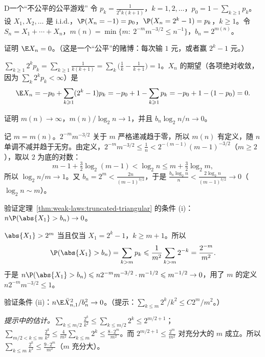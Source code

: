 \thinkingpart

\begin{probleme}[问题]{D}{一个“不公平的公平游戏”}
令 $p_k=\frac1{2^kk(k+1)}$，$k=1,2,\dots$，$p_0=1-\sum_{k\geqslant1}p_k$。设 $X_1,X_2,\dots$ 是 i.i.d.，$\P(X_n=-1)=p_0$，$\P(X_n=2^k-1)=p_k$，$k\geqslant1$。令 $S_n=X_1+\cdots+X_n$，$m(n)=\min\{m:\ 2^{-m}m^{-3/2}\leqslant n^{-1}\}$，$b_n=2^{m(n)}$。
\begin{questions}
\item 证明 $\E X_n=0$。（这是一个“公平”的赌博：每次输 $1$ 元，或者赢 $2^k-1$ 元。）
\begin{solution}
$\sum_{k\geqslant1}2^kp_k=\sum_{k\geqslant1}\frac1{k(k+1)}=\sum_k\bigl(\frac1k-\frac1{k+1}\bigr)=1$。$X_n$ 的期望（各项绝对收敛，因为 $\sum_k2^kp_k<\infty$）是
\[
\E X_n=-p_0+\sum_{k\geqslant1}(2^k-1)p_k=-p_0+1-\sum_{k\geqslant1}p_k=-p_0+1-(1-p_0)=0 .
\]
\end{solution}
\item 证明 $m(n)\to\infty$，$m(n)/\log_2n\to1$，并且 $b_n\log_2n/n\to0$。
\begin{solution}
记 $m=m(n)$。$2^{-m}m^{-3/2}$ 关于 $m$ 严格递减趋于零，所以 $m(n)$ 有定义，随 $n$ 单调不减并趋于无穷。由定义，$2^{-m}m^{-3/2}\leqslant\frac1n<2^{-(m-1)}(m-1)^{-3/2}$（$m\geqslant2$），取以 $2$ 为底的对数：
\[
m-1+\tfrac32\log_2(m-1)<\log_2n\leqslant m+\tfrac32\log_2m,
\]
所以 $\log_2n/m\to1$。又 $b_n=2^m<\frac{2n}{(m-1)^{3/2}}$，于是 $\frac{b_n\log_2n}n<\frac{2\log_2n}{(m-1)^{3/2}}\to0$（$\log_2n\sim m$）。
\end{solution}
\item 验证定理~\ref{thm:weak-laws:truncated-triangular} 的条件 (i)：$n\P(\abs{X_1}>b_n)\to0$。
\begin{solution}
$\abs{X_1}>2^m$ 当且仅当 $X_1=2^k-1$，$k\geqslant m+1$。所以
\[
\P(\abs{X_1}>b_n)=\sum_{k>m}p_k\leqslant\frac1{m^2}\sum_{k>m}2^{-k}=\frac{2^{-m}}{m^2}.
\]
于是 $n\P(\abs{X_1}>b_n)\leqslant n2^{-m}m^{-3/2}\cdot m^{-1/2}\leqslant m^{-1/2}\to0$，用了 $m$ 的定义 $n2^{-m}m^{-3/2}\leqslant1$。
\end{solution}
\item 验证条件 (ii)：$n\E\bar X_{n,1}^2/b_n^2\to0$。（提示：$\sum_{k\leqslant m}2^k/k^2\leqslant C2^m/m^2$。）
\begin{solution}
\emph{提示中的估计。}$\sum_{k\leqslant m/2}\frac{2^k}{k^2}\leqslant\sum_{k\leqslant m/2}2^k\leqslant2^{m/2+1}$；$\sum_{m/2<k\leqslant m}\frac{2^k}{k^2}\leqslant\frac4{m^2}\sum_{k\leqslant m}2^k\leqslant\frac{8\cdot2^m}{m^2}$。而 $2^{m/2+1}\leqslant\frac{2^m}{m^2}$ 对充分大的 $m$ 成立。所以 $\sum_{k\leqslant m}\frac{2^k}{k^2}\leqslant\frac{9\cdot2^m}{m^2}$（$m$ 充分大）。


\end{solution}
\end{questions}
\end{probleme}
